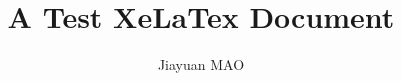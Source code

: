 \documentclass[a4paper, 12pt, titlepage]{article}
\begin{document}
\setlength{\parindent}{2em}                    

\title{A Test XeLaTex Document}
\author{Jiayuan MAO}
\maketitle

\tableofcontents
\listoffigures
\listoftables
\end{document}
